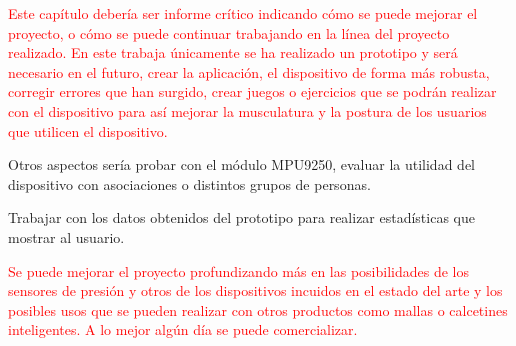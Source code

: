 


\textcolor{red}{Este capítulo debería ser informe crítico indicando cómo se puede mejorar el proyecto, o cómo se puede continuar trabajando en la línea del proyecto realizado.
En este trabaja únicamente se ha realizado un prototipo y será necesario en el futuro, crear la aplicación, el dispositivo de forma más robusta, corregir errores que han surgido, crear juegos o ejercicios que se podrán realizar con el dispositivo para así mejorar la musculatura y la postura de los usuarios que utilicen el dispositivo.}

Otros aspectos sería probar con el módulo MPU9250, evaluar la utilidad del dispositivo con asociaciones o distintos grupos de personas.

Trabajar con los datos obtenidos del prototipo para realizar estadísticas que mostrar al usuario.

\textcolor{red}{Se puede mejorar el proyecto profundizando más en las posibilidades de los sensores de presión y otros de los dispositivos incuidos en el estado del arte y los posibles usos que se pueden realizar con  otros productos como mallas o calcetines inteligentes. A lo mejor algún día se puede comercializar.}

